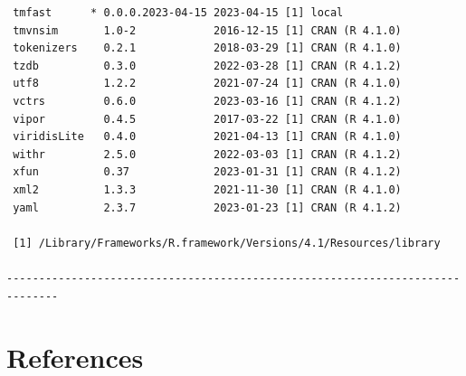 \documentclass[
]{article}
\begin{document}
\begin{verbatim}
 tmfast      * 0.0.0.2023-04-15 2023-04-15 [1] local
 tmvnsim       1.0-2            2016-12-15 [1] CRAN (R 4.1.0)
 tokenizers    0.2.1            2018-03-29 [1] CRAN (R 4.1.0)
 tzdb          0.3.0            2022-03-28 [1] CRAN (R 4.1.2)
 utf8          1.2.2            2021-07-24 [1] CRAN (R 4.1.0)
 vctrs         0.6.0            2023-03-16 [1] CRAN (R 4.1.2)
 vipor         0.4.5            2017-03-22 [1] CRAN (R 4.1.0)
 viridisLite   0.4.0            2021-04-13 [1] CRAN (R 4.1.0)
 withr         2.5.0            2022-03-03 [1] CRAN (R 4.1.2)
 xfun          0.37             2023-01-31 [1] CRAN (R 4.1.2)
 xml2          1.3.3            2021-11-30 [1] CRAN (R 4.1.0)
 yaml          2.3.7            2023-01-23 [1] CRAN (R 4.1.2)

 [1] /Library/Frameworks/R.framework/Versions/4.1/Resources/library

------------------------------------------------------------------------------
\end{verbatim}

\hypertarget{references}{%
\section*{References}\label{references}}
\end{document}
